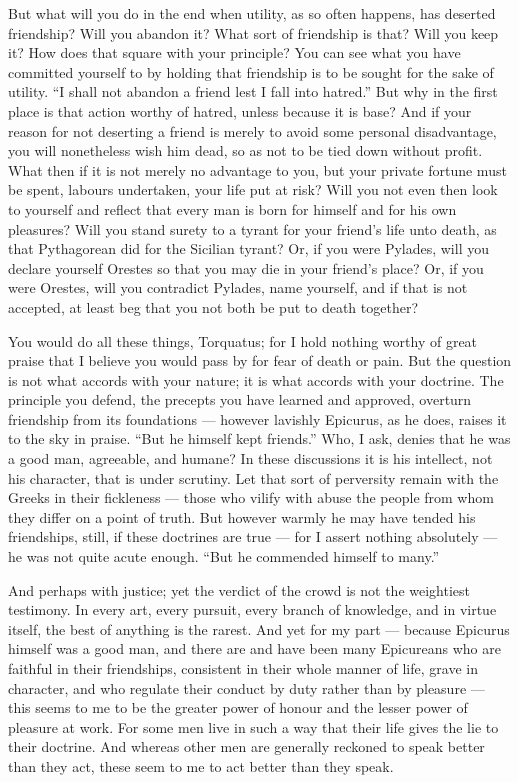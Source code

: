  But what will you do in the end when utility, as so often happens, has deserted friendship? Will you abandon it? What sort of friendship is that? Will you keep it? How does that square with your principle? You can see what you have committed yourself to by holding that friendship is to be sought for the sake of utility. ``I shall not abandon a friend lest I fall into hatred.'' But why in the first place is that action worthy of hatred, unless because it is base? And if your reason for not deserting a friend is merely to avoid some personal disadvantage, you will nonetheless wish him dead, so as not to be tied down without profit. What then if it is not merely no advantage to you, but your private fortune must be spent, labours undertaken, your life put at risk? Will you not even then look to yourself and reflect that every man is born for himself and for his own pleasures? Will you stand surety to a tyrant for your friend's life unto death, as that Pythagorean did for the Sicilian tyrant? Or, if you were Pylades, will you declare yourself Orestes so that you may die in your friend's place? Or, if you were Orestes, will you contradict Pylades, name yourself, and if that is not accepted, at least beg that you not both be put to death together?

 You would do all these things, Torquatus; for I hold nothing worthy of great praise that I believe you would pass by for fear of death or pain. But the question is not what accords with your nature; it is what accords with your doctrine. The principle you defend, the precepts you have learned and approved, overturn friendship from its foundations — however lavishly Epicurus, as he does, raises it to the sky in praise. ``But he himself kept friends.'' Who, I ask, denies that he was a good man, agreeable, and humane? In these discussions it is his intellect, not his character, that is under scrutiny. Let that sort of perversity remain with the Greeks in their fickleness — those who vilify with abuse the people from whom they differ on a point of truth. But however warmly he may have tended his friendships, still, if these doctrines are true — for I assert nothing absolutely — he was not quite acute enough. ``But he commended himself to many.''

 And perhaps with justice; yet the verdict of the crowd is not the weightiest testimony. In every art, every pursuit, every branch of knowledge, and in virtue itself, the best of anything is the rarest. And yet for my part — because Epicurus himself was a good man, and there are and have been many Epicureans who are faithful in their friendships, consistent in their whole manner of life, grave in character, and who regulate their conduct by duty rather than by pleasure — this seems to me to be the greater power of honour and the lesser power of pleasure at work. For some men live in such a way that their life gives the lie to their doctrine. And whereas other men are generally reckoned to speak better than they act, these seem to me to act better than they speak.

